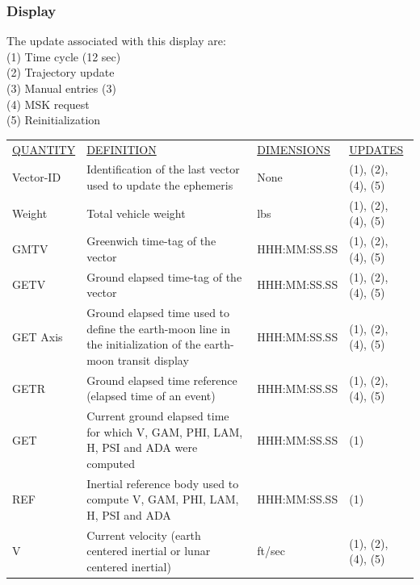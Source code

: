 \documentclass[11pt]{article} %
\begin{document}
\subsubsection{Display}

The update associated with this display are:\\

(1) Time cycle (12 sec)\\
(2) Trajectory update\\
(3) Manual entries (3)\\
(4) MSK request\\
(5) Reinitialization\\
\begin{center}
\begin{tabular}{ L{2.4cm} L{5.1cm} L{3cm} L{3.8cm} }
\underline{QUANTITY} & \underline{DEFINITION} & \underline{DIMENSIONS} & \underline{UPDATES} \\
Vector-ID & Identification of the last vector used to update the ephemeris & None &(1), (2), (4), (5)\\
Weight & Total vehicle weight & lbs & (1), (2), (4), (5)\\
GMTV & Greenwich time-tag of the vector & HHH:MM:SS.SS &(1), (2), (4), (5)\\
GETV & Ground elapsed time-tag of the vector & HHH:MM:SS.SS &(1), (2), (4), (5)\\
GET Axis & Ground elapsed time used to define the earth-moon line in the initialization of the earth-moon transit display&HHH:MM:SS.SS &(1), (2), (4), (5)\\
GETR & Ground elapsed time reference (elapsed time of an event) &HHH:MM:SS.SS &(1), (2), (4), (5)\\
GET & Current ground elapsed time for which V, GAM, PHI, LAM, H, PSI and ADA were computed&HHH:MM:SS.SS &(1)\\
REF & Inertial reference body used to compute V, GAM, PHI, LAM, H, PSI and ADA&HHH:MM:SS.SS &(1)\\
V & Current velocity (earth centered inertial or lunar centered inertial) & ft/sec &(1), (2), (4), (5)\\
\end{tabular}
\end{center}
\end{document}
